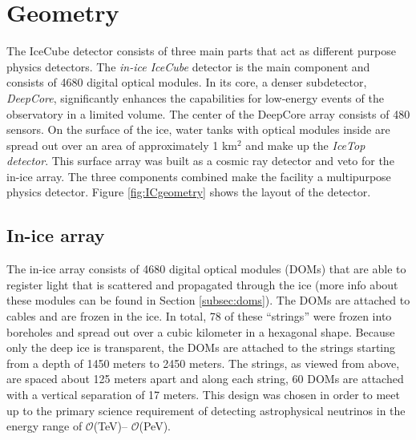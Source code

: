 \section{Geometry}
The IceCube detector consists of three main parts that act as different purpose physics detectors. 
The \textit{in-ice IceCube} detector is the main component and consists of 4680 digital optical modules. In its core, a denser subdetector, \textit{DeepCore}, significantly enhances the capabilities for low-energy events of the observatory in a limited volume. The center of the DeepCore array consists of 480 sensors.
On the surface of the ice, water tanks with optical modules inside are spread out over an area of approximately 1 km$^2$ and make up the \textit{IceTop detector}. This surface array was built as a cosmic ray detector and veto for the in-ice array.  The three components combined make the facility a multipurpose physics detector. Figure \ref{fig:ICgeometry} shows the layout of the detector.

\subsection{In-ice array}
The in-ice array consists of 4680 digital optical modules (DOMs) that are able to register light that is scattered and propagated through the ice (more info about these modules can be found in Section \ref{subsec:doms}). The DOMs are attached to cables and are frozen in the ice. In total, 78 of these ``strings'' were frozen into boreholes and spread out over a cubic kilometer in a hexagonal shape. Because only the deep ice is transparent, the DOMs are attached to the strings starting from a depth of 1450 meters to 2450 meters. The strings, as viewed from above, are spaced about 125 meters apart and along each string, 60 DOMs are attached with a vertical separation of 17 meters. This design was chosen in order to meet up to the primary science requirement of detecting astrophysical neutrinos in the energy range of $\mathcal{O}$(TeV)– $\mathcal{O}$(PeV).

 
